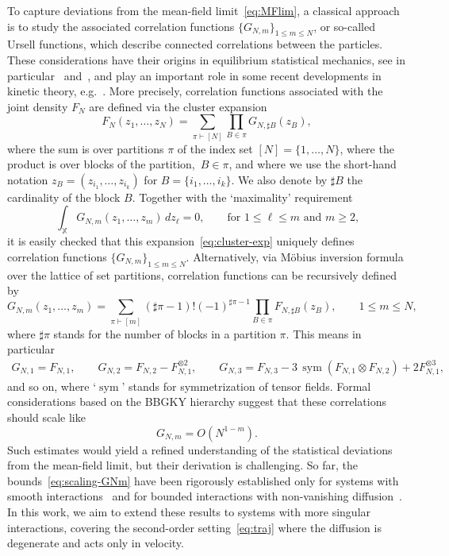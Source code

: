 \documentclass[a4paper,11pt,reqno,noindent]{amsart}
\theoremstyle{plain}
\theoremstyle{definition}
\numberwithin{equation}{section}
\newcommand{\Xd}{\mathbb X}
\newcommand{\Sym}{{\operatorname{sym}}}
\begin{document}
To capture deviations from the mean-field limit~\eqref{eq:MFlim}, a classical approach is to study the associated correlation functions $\{G_{N,m}\}_{1\le m\le N}$, or so-called Ursell functions, which describe connected correlations between the particles. These considerations have their origins in equilibrium statistical mechanics, see in particular~\cite[Chapter~13]{Mayer-40} and~\cite[Chapter~4]{Ruelle-69}, and play an important role in some recent developments in kinetic theory, e.g.~\cite{PS-17,BGS-17,DSR-21,DJ-24}.
More precisely, correlation functions associated with the joint density $F_N$ are defined via the cluster expansion
\begin{equation}\label{eq:cluster-exp}
F_N(z_1,\ldots,z_N)=\sum_{\pi\vdash{}[ N]}\prod_{B\in\pi}G_{N,\sharp B}(z_B),
\end{equation}
where the sum is over partitions $\pi$ of the index set $[N]=\{1,\ldots,N\}$, where the product is over blocks of the partition,~$B\in\pi$, and where we use the short-hand notation $z_B=(z_{i_1},\ldots,z_{i_k})$ for $B=\{i_1,\ldots,i_k\}$. We also denote by $\sharp B$ the cardinality of the block $B$. Together with the `maximality' requirement
\[\int_{\Xd}G_{N,m}(z_1,\ldots,z_m)\,dz_\ell=0,\qquad\text{for $1\le \ell\le m$ and $m\ge2$,}\]
it is easily checked that this expansion~\eqref{eq:cluster-exp} uniquely defines correlation functions $\{G_{N,m}\}_{1\le m\le N}$.
Alternatively, via M\"obius inversion formula over the lattice of set partitions, correlation functions can be recursively defined by
\begin{equation}\label{eq:correl}
G_{N,m}(z_1,\ldots,z_m)=\sum_{\pi\vdash{}[ m]}(\sharp\pi-1)!(-1)^{\sharp\pi-1}\prod_{B\in\pi}F_{N,\sharp B}(z_B),\qquad1\le m\le N,
\end{equation}
where $\sharp\pi$ stands for the number of blocks in a partition $\pi$.
This means in particular
\begin{gather*}
G_{N,1}=F_{N,1},\qquad G_{N,2}=F_{N,2}-F_{N,1}^{\otimes2},\qquad G_{N,3}=F_{N,3}-3\,\Sym(F_{N,1}\otimes F_{N,2})+2F_{N,1}^{\otimes3},
\end{gather*}
and so on, where `$\Sym$' stands for symmetrization of tensor fields.
Formal considerations based on the BBGKY hierarchy suggest that these correlations should scale like
\begin{equation}\label{eq:scaling-GNm}
G_{N,m}=O(N^{1-m}).
\end{equation}
Such estimates would yield a refined understanding of the statistical deviations from the mean-field limit, but their derivation is challenging. So far, the bounds~\eqref{eq:scaling-GNm} have been rigorously established only for systems with smooth interactions~\cite{D-21} and for bounded interactions with non-vanishing diffusion~\cite{Hess_Childs_2023}. In this work, we aim to extend these results to systems with more singular interactions, covering the second-order setting~\eqref{eq:traj} where the diffusion is degenerate and acts only in velocity.
\end{document}

